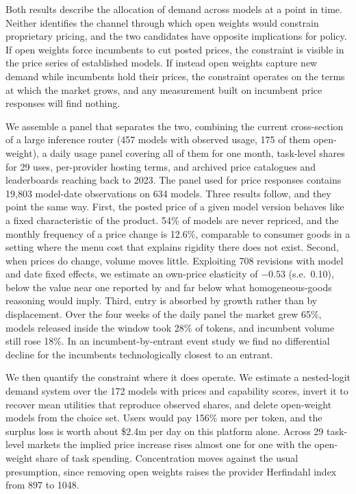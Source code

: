 \documentclass{article}
\newcommand{\Nactive}{457}
\newcommand{\Nopen}{175}
\newcommand{\NeverRepriced}{54}
\newcommand{\MonthlyFreq}{12.6}
\newcommand{\PanelObs}{19{,}803}
\newcommand{\PanelModels}{634}
\newcommand{\NRevisions}{708}
\newcommand{\ElastTok}{$-0.53$}
\newcommand{\ElastTokSE}{0.10}
\newcommand{\MarketGrowth}{65}
\newcommand{\EntrantShare}{28}
\newcommand{\IncumbentGrowth}{18}
\newcommand{\CFmodels}{172}
\newcommand{\CFprice}{156}
\newcommand{\CFdollars}{2.4}
\newcommand{\CFhhiBase}{897}
\newcommand{\CFhhiCf}{1048}
\newcommand{\Ntasks}{29}
\begin{document}
Both results describe the allocation of demand across models at a point in time. Neither
identifies the channel through which open weights would constrain proprietary pricing, and
the two candidates have opposite implications for policy. If open weights force incumbents to
cut posted prices, the constraint is visible in the price series of established models. If
instead open weights capture new demand while incumbents hold their prices, the constraint
operates on the terms at which the market grows, and any measurement built on incumbent price
responses will find nothing.

We assemble a panel that separates the two, combining the current cross-section of a large
inference router (\Nactive{} models with observed usage, \Nopen{} of them open-weight), a
daily usage panel covering all of them for one month, task-level shares for \Ntasks{} uses,
per-provider hosting terms, and archived price catalogues and leaderboards reaching back to
2023. The panel used for price responses contains \PanelObs{} model-date observations on
\PanelModels{} models. Three results follow, and they point the same way. First, the posted price of a given model version behaves like a fixed
characteristic of the product. \NeverRepriced\% of models are never repriced, and the
monthly frequency of a price change is \MonthlyFreq\%, comparable to consumer goods
\citep{nakamura2008,klenow2011} in a setting where the menu cost that explains rigidity
there does not exist. Second, when prices do change, volume moves little. Exploiting
\NRevisions{} revisions with model and date fixed effects, we estimate an own-price
elasticity of \ElastTok{} (s.e.\ \ElastTokSE), below the value near one reported by
\citet{demirer2025} and far below what homogeneous-goods reasoning would imply. Third,
entry is absorbed by growth rather than by displacement. Over the four weeks of the daily
panel the market grew \MarketGrowth\%, models released inside the window took
\EntrantShare\% of tokens, and incumbent volume still rose \IncumbentGrowth\%. In an
incumbent-by-entrant event study we find no differential decline for the incumbents
technologically closest to an entrant.

We then quantify the constraint where it does operate. We estimate a nested-logit demand
system over the \CFmodels{} models with prices and capability scores, invert it to
recover mean utilities that reproduce observed shares, and delete open-weight models
from the choice set. Users would pay \CFprice\% more per token, and the surplus loss is
worth about \$\CFdollars{}m per day on this platform alone. Across \Ntasks{} task-level
markets the implied price increase rises almost one for one with the open-weight share
of task spending. Concentration moves against the usual presumption, since removing
open weights raises the provider Herfindahl index from \CFhhiBase{} to \CFhhiCf{}.
\end{document}

